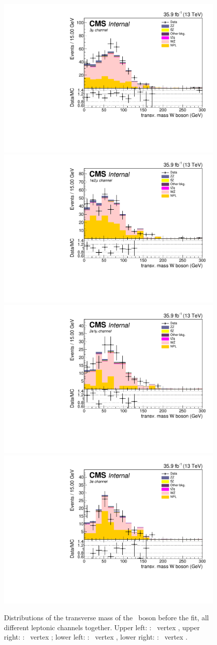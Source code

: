 \begin{figure}[htbp]
	\centering
	\includegraphics[width=0.49\linewidth]{6_Search/Figures/MTWstack/AllBkg/MTW_uuu_Stack}
	\includegraphics[width=0.49\linewidth]{6_Search/Figures/MTWstack/AllBkg/MTW_uue_Stack}
	\includegraphics[width=0.49\linewidth]{6_Search/Figures/MTWstack/AllBkg/MTW_eeu_Stack}
	\includegraphics[width=0.49\linewidth]{6_Search/Figures/MTWstack/AllBkg/MTW_eee_Stack}
	\caption{Distributions of the transverse mass of the \PW\ boson before the fit, all different leptonic channels together. Upper left: \TTSR: \Zut\ vertex , upper right: \TTSR: \Zct\ vertex ; lower left: \STSR: \Zut\ vertex , lower right: \STSR: \Zct\ vertex .}
	\label{fig:mtwallstac}
\end{figure}
\clearpage
